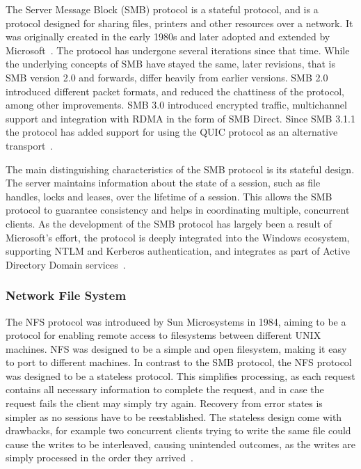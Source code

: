 \documentclass[english, 12pt, a4paper, elec, utf8, a-2b, online]{aaltothesis}
\begin{document}
The Server Message Block (SMB) protocol is a stateful protocol, and is a protocol designed for
sharing files, printers and other resources over a network. It was originally created
in the early 1980s and later adopted and extended by Microsoft~\cite{samba_myths}.
The protocol has undergone several iterations since that time. While the underlying
concepts of SMB have stayed the same, later revisions, that is SMB version 2.0 and forwards,
differ heavily from earlier versions. SMB 2.0 introduced different packet formats, and reduced
the chattiness of the protocol, among other improvements. SMB 3.0 introduced encrypted traffic,
multichannel support and integration with RDMA in the form of SMB Direct. Since SMB 3.1.1 the
protocol has added support for using the QUIC protocol as an alternative transport~\cite{smb2}.

The main distinguishing characteristics of the SMB protocol is its stateful design.
The server maintains information about the state of a session, such as file handles,
locks and leases, over the lifetime of a session. This allows the SMB protocol to
guarantee consistency and helps in coordinating multiple, concurrent clients. As 
the development of the SMB protocol has largely been a result of Microsoft's effort,
the protocol is deeply integrated into the Windows ecosystem,
supporting NTLM and Kerberos authentication, and integrates as part of Active Directory Domain
services~\cite{smb2}.

\subsubsection{Network File System}

The NFS protocol was introduced by Sun Microsystems in 1984, aiming to be a protocol
for enabling remote access to filesystems between different UNIX machines. NFS was
designed to be a simple and open filesystem, making it easy to port to different
machines. In contrast to the SMB protocol, the NFS protocol was designed to be a 
stateless protocol. This simplifies processing, as each request contains all necessary
information to complete the request, and in case the request fails the client may
simply try again. Recovery from error states is simpler as no sessions have to be
reestablished. The stateless  design come with drawbacks,
for example two concurrent clients trying to write the same file could cause the
writes to be interleaved, causing unintended outcomes, as the writes are simply
processed in the order they arrived~\cite{nfs_design}.
\end{document}
